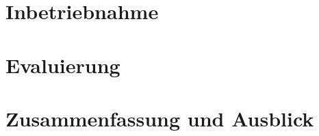 \documentclass[oneside]{ausarbeitung}
\begin{document}
\chapter{Inbetriebnahme}
\label{cha:inbetriebnahme}


\chapter{Evaluierung}
\label{cha:evaluierung}


\chapter{Zusammenfassung und Ausblick}
\label{cha:zusammenfassung}


\appendix

\printbibliography[heading=bibintoc]
\end{document}
